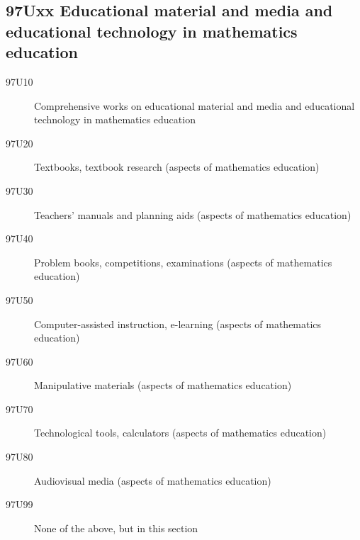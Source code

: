 \documentclass[letterpaper]{article}
\begin{document}
\subsection*{97Uxx  Educational material and media and educational technology in mathematics education}\label{97Uxx}
\begin{description}  
\item [97U10]\label{97U10} Comprehensive works on educational material and media and educational technology in mathematics education
\item [97U20]\label{97U20} Textbooks, textbook research (aspects of mathematics education)
\item [97U30]\label{97U30} Teachers' manuals and planning aids (aspects of mathematics education)
\item [97U40]\label{97U40} Problem books, competitions, examinations (aspects of mathematics education)
\item [97U50]\label{97U50} Computer-assisted instruction, e-learning (aspects of mathematics education)
\item [97U60]\label{97U60} Manipulative materials (aspects of mathematics education)
\item [97U70]\label{97U70} Technological tools, calculators (aspects of mathematics education)
\item [97U80]\label{97U80} Audiovisual media (aspects of mathematics education)
\item [97U99]\label{97U99} None of the above, but in this section

\end{description}
\end{document}
